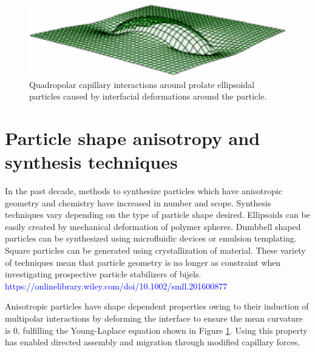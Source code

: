 
\begin{figure}
    \centering
    \includegraphics[scale = 0.5]{figures/literature_review/interfacial_curvature.png}
    \caption{Quadropolar capillary interactions around prolate ellipsoidal particles caused by interfacial deformations around the particle. \cite{loudet_capillary_2005}}
    \label{fig:anisotropic_particle_interface}
\end{figure}

\section{Particle shape anisotropy and synthesis techniques}

In the past decade, methods to synthesize particles which have anisotropic geometry and chemistry have increased in number and scope. Synthesis techniques vary depending on the type of particle shape desired. Ellipsoids can be easily created by mechanical deformation of polymer spheres. Dumbbell shaped particles can be synthesized using microfluidic devices or emulsion templating. Square particles can be generated using crystallization of material. \cite{morgan_understanding_2013} These variety of techniques mean that particle geometry is no longer as constraint when investigating prospective particle stabilizers of bijels. \textcolor{blue}{https://onlinelibrary.wiley.com/doi/10.1002/smll.201600877}

Anisotropic particles have shape dependent properties owing to their induction of multipolar interactions by deforming the interface to ensure the mean curvature is 0,  fulfilling the Young-Laplace equation shown in Figure \ref{fig:anisotropic_particle_interface}. \cite{loudet_capillary_2005, cheng_shape-anisotropic_2013} Using this property has enabled directed assembly and migration through modified capillary forces. \cite{cavallaro_curvature-driven_2011, read_dimerization_2020, sharifi-mood_curvature_2015} 

